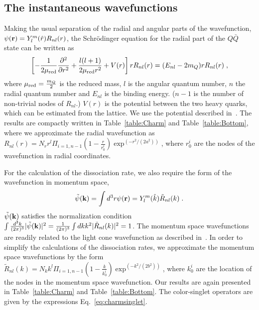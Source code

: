 \documentclass[article,showpacs,preprintnumbers,amsmath,amssymb]{revtex4}
\newcommand{\barQ}{{\bar{Q}}}
\newcommand{\bfk}{{\bf{k}}}
\newcommand{\bfr}{{\bf{r}}}
\newcommand{\hatr}{{\hat{r}}}
\newcommand{\hatk}{{\hat{k}}}
\newcommand{\tilR}{{\tilde{R}}}
\newcommand{\tilpsi}{{\tilde{\psi}}}
\begin{document}
\subsection{The instantaneous wavefunctions~\label{section:Potential}}
Making the usual separation of the radial and angular parts of the
wavefunction, $\psi(\bfr)=Y_l^m(\hatr)  R_{nl}(r)$, the Schr\"{o}dinger
equation for the radial part of the $Q\barQ$ state can be written as
\begin{equation}
\left[-\frac{1}{2\mu_{\rm{red}}}\frac{\partial^2}{\partial r^2}
 +\frac{l(l+1)}{2\mu_{\rm{red}} r^2}
 +V(r)\right]rR_{nl}(r) = (E_{nl}-2m_Q) rR_{nl}(r)  \; , 
\end{equation}
where $\mu_{\rm{red}}=\frac{m_Q}{2}$ is the reduced mass, $l$ is the angular
quantum number, $n$ the radial quantum number and $E_{nl}$ is the binding
energy. ($n-1$ is the number of non-trivial nodes of $R_{nl}$.)
$V(r)$ is the potential between the two heavy quarks, which can be estimated
from the lattice. We use the potential described in~\cite{Mocsy:2007jz}. The
results are compactly written in Table~\ref{table:Charm} and
Table~\ref{table:Bottom}, where we approximate the radial wavefunction as
$R_{nl}(r)=N_r r^l \Pi_{i=1, n-1}(1-\frac{r}{r_0^i}) \exp^{(-r^2/(2a^2))}$,
where ${r_0^i}$ are the nodes of the wavefunction in radial coordinates.

For the calculation of the dissociation rate, we also require the form of the
wavefunction in momentum space,
\begin{equation}
\tilpsi(\bfk) = \int d^3 r \psi(\bfr) = Y_l^m(\hatk) \tilR_{nl}(k)\;.
\end{equation}
$\tilpsi(\bfk)$ satisfies the normalization condition 
$\int \frac{d^3 k}{(2\pi)^3}|\tilpsi(\bfk)|^2
=\frac{1}{(2\pi)^3}\int dk k^2 |\tilR_{nl}(k)|^2=1$.  The momentum space
wavefunctions are readily related to the light cone wavefunction as described
in~\cite{Sharma:2009hn}. In order to simplify the calculations of the dissociation rates, we approximate
the momentum space wavefunctions by the form $\tilR_{nl}(k)=N_kk^l\Pi_{i=1,
n-1}(1-\frac{k}{k_0^i}) \exp^{(-k^2/(2b^2))}$, where ${k_0^i}$
are the location of the nodes in the momentum space wavefunction. Our results are again presented  in 
Table~\ref{table:Charm} and Table~\ref{table:Bottom}.
The color-singlet operators are given by the expressions Eq.~\ref{eq:charmsinglet}.
\end{document}
